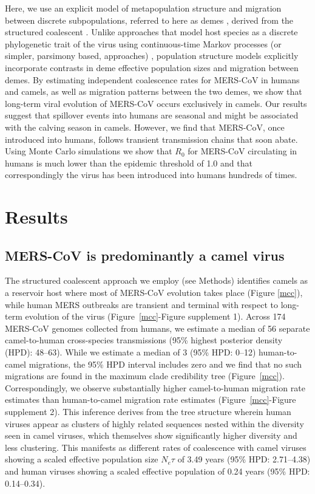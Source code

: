 \documentclass[9pt,lineno]{elife}
\begin{document}
Here, we use an explicit model of metapopulation structure and migration between discrete subpopulations, referred to here as demes \citep{vaughan_efficient_2014}, derived from the structured coalescent \citep{notohara_structured_coalescent_1990}.
Unlike approaches that model host species as a discrete phylogenetic trait of the virus using continuous-time Markov processes (or simpler, parsimony based, approaches) \citep{faria_simultaneously_2013,lycett_h5n8_2016}, population structure models explicitly incorporate contrasts in deme effective population sizes and migration between demes.
By estimating independent coalescence rates for MERS-CoV in humans and camels, as well as migration patterns between the two demes, we show that long-term viral evolution of MERS-CoV occurs exclusively in camels.
Our results suggest that spillover events into humans are seasonal and might be associated with the calving season in camels.
However, we find that MERS-CoV, once introduced into humans, follows transient transmission chains that soon abate.
Using Monte Carlo simulations we show that $R_{0}$ for MERS-CoV circulating in humans is much lower than the epidemic threshold of 1.0 and that correspondingly the virus has been introduced into humans hundreds of times.

\section*{Results}

\subsection*{MERS-CoV is predominantly a camel virus}

The structured coalescent approach we employ (see Methods) identifies camels as a reservoir host where most of MERS-CoV evolution takes place (Figure \ref{mcc}), while human MERS outbreaks are transient and terminal with respect to long-term evolution of the virus (Figure~\ref{mcc}-Figure supplement 1).
Across 174 MERS-CoV genomes collected from humans, we estimate a median of 56 separate camel-to-human cross-species transmissions (95\% highest posterior density (HPD): 48--63).
While we estimate a median of 3 (95\% HPD: 0--12) human-to-camel migrations, the 95\% HPD interval includes zero and we find that no such migrations are found in the maximum clade credibility tree (Figure~\ref{mcc}).
Correspondingly, we observe substantially higher camel-to-human migration rate estimates than human-to-camel migration rate estimates (Figure~\ref{mcc}-Figure supplement 2).
This inference derives from the tree structure wherein human viruses appear as clusters of highly related sequences nested within the diversity seen in camel viruses, which themselves show significantly higher diversity and less clustering.
This manifests as different rates of coalescence with camel viruses showing a scaled effective population size $N_e \tau$ of 3.49 years (95\% HPD: 2.71--4.38) and human viruses showing a scaled effective population of 0.24 years (95\% HPD: 0.14--0.34).
\end{document}
